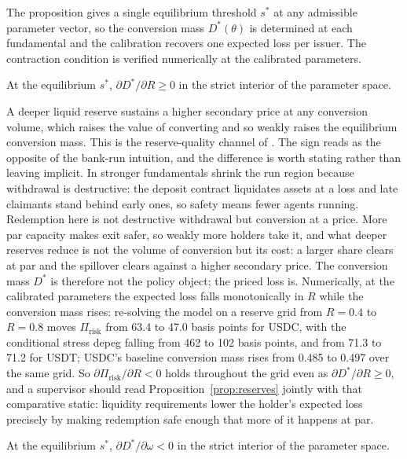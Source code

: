 The proposition gives a single equilibrium threshold $s^*$ at any admissible parameter vector, so the conversion mass $D^*(\theta)$ is determined at each fundamental and the calibration recovers one expected loss per issuer. The contraction condition is verified numerically at the calibrated parameters.

\begin{proposition}\label{prop:reserves}
At the equilibrium $s^*$, $\partial D^*/\partial R \geq 0$ in the strict interior of the parameter space.
\end{proposition}

A deeper liquid reserve sustains a higher secondary price at any conversion volume, which raises the value of converting and so weakly raises the equilibrium conversion mass. This is the reserve-quality channel of \citet{ma_zeng_zhang_2025}. The sign reads as the opposite of the bank-run intuition, and the difference is worth stating rather than leaving implicit. In \citet{goldstein_pauzner_2005_demand_deposits} stronger fundamentals shrink the run region because withdrawal is destructive: the deposit contract liquidates assets at a loss and late claimants stand behind early ones, so safety means fewer agents running. Redemption here is not destructive withdrawal but conversion at a price. More par capacity makes exit safer, so weakly more holders take it, and what deeper reserves reduce is not the volume of conversion but its cost: a larger share clears at par and the spillover clears against a higher secondary price. The conversion mass $D^*$ is therefore not the policy object; the priced loss is. Numerically, at the calibrated parameters the expected loss falls monotonically in $R$ while the conversion mass rises: re-solving the model on a reserve grid from $R=0.4$ to $R=0.8$ moves $\Pi_{\text{risk}}$ from 63.4 to 47.0 basis points for USDC, with the conditional stress depeg falling from 462 to 102 basis points, and from 71.3 to 71.2 for USDT; USDC's baseline conversion mass rises from 0.485 to 0.497 over the same grid. So $\partial \Pi_{\text{risk}}/\partial R < 0$ holds throughout the grid even as $\partial D^*/\partial R \geq 0$, and a supervisor should read Proposition~\ref{prop:reserves} jointly with that comparative static: liquidity requirements lower the holder's expected loss precisely by making redemption safe enough that more of it happens at par.

\begin{proposition}\label{prop:convenience}
At the equilibrium $s^*$, $\partial D^*/\partial \omega < 0$ in the strict interior of the parameter space.
\end{proposition}

